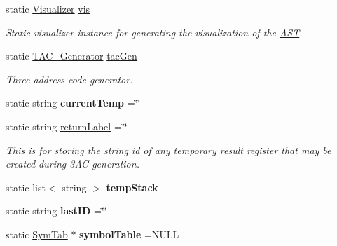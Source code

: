 \begin{DoxyCompactItemize}
\item 
\hypertarget{classAST_a5fdfd5f7b104dd92889163bdadbc68d6}{static \hyperlink{classVisualizer}{Visualizer} \hyperlink{classAST_a5fdfd5f7b104dd92889163bdadbc68d6}{vis}}\label{classAST_a5fdfd5f7b104dd92889163bdadbc68d6}

\begin{DoxyCompactList}\small\item\em Static visualizer instance for generating the visualization of the \hyperlink{classAST}{A\-S\-T}. \end{DoxyCompactList}\item 
\hypertarget{classAST_a8a3ace322f50e030331065d644ee55ee}{static \hyperlink{classTAC__Generator}{T\-A\-C\-\_\-\-Generator} \hyperlink{classAST_a8a3ace322f50e030331065d644ee55ee}{tac\-Gen}}\label{classAST_a8a3ace322f50e030331065d644ee55ee}

\begin{DoxyCompactList}\small\item\em Three address code generator. \end{DoxyCompactList}\item 
\hypertarget{classAST_a1f69448c6dc368d005631a128460083d}{static string {\bfseries current\-Temp} =\char`\"{}\char`\"{}}\label{classAST_a1f69448c6dc368d005631a128460083d}

\item 
\hypertarget{classAST_a551aec090c932ab69365238b40a8a4eb}{static string \hyperlink{classAST_a551aec090c932ab69365238b40a8a4eb}{return\-Label} =\char`\"{}\char`\"{}}\label{classAST_a551aec090c932ab69365238b40a8a4eb}

\begin{DoxyCompactList}\small\item\em This is for storing the string id of any temporary result register that may be created during 3\-A\-C generation. \end{DoxyCompactList}\item 
\hypertarget{classAST_a73c0a266df52be71e6b527b6aa635173}{static list$<$ string $>$ {\bfseries temp\-Stack}}\label{classAST_a73c0a266df52be71e6b527b6aa635173}

\item 
\hypertarget{classAST_abf9e84b541ff04b7bb64e6e4371512d4}{static string {\bfseries last\-I\-D} =\char`\"{}\char`\"{}}\label{classAST_abf9e84b541ff04b7bb64e6e4371512d4}

\item 
\hypertarget{classAST_a163003bfe9c30510ec8039870346049f}{static \hyperlink{classSymTab}{Sym\-Tab} $\ast$ {\bfseries symbol\-Table} =N\-U\-L\-L}\label{classAST_a163003bfe9c30510ec8039870346049f}


\end{DoxyCompactItemize}
